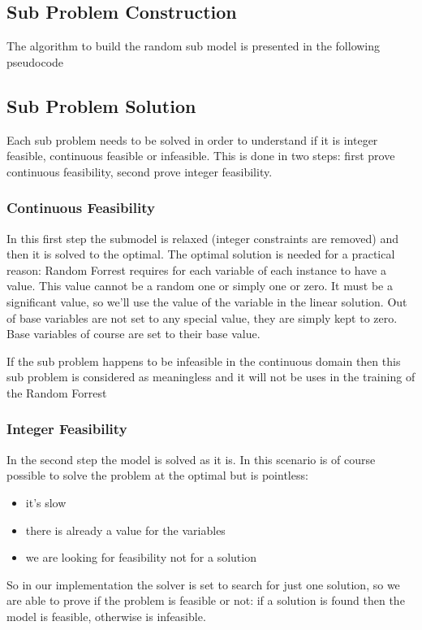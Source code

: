 \subsection{Sub Problem Construction}

The algorithm to build the random sub model is presented in the following pseudocode




\subsection{Sub Problem Solution}
Each sub problem needs to be solved in order to understand if it is integer feasible, continuous feasible or infeasible. 
This is done in two steps: first prove continuous feasibility, second prove integer feasibility. 

\subsubsection{Continuous Feasibility}
In this first step the submodel is relaxed (integer constraints are removed) and then it is solved to the optimal. The optimal solution is needed for a 
practical reason: Random Forrest requires for each variable of each instance to have a value. This value cannot be a random one or simply one or zero. It
must be a significant value, so we'll use the value of the variable in the linear solution. Out of base variables are not set to any special value, they are 
simply kept to zero. Base variables of course are set to their base value. 

If the sub problem happens to be infeasible in the continuous domain then this sub problem is considered as meaningless and it will not be uses in the training of the Random Forrest


\subsubsection{Integer Feasibility}
In the second step the model is solved as it is. In this scenario is of course possible to solve the problem at the optimal but is pointless: 
\begin{itemize}
    \item it's slow
    \item there is already a value for the variables
    \item we are looking for feasibility not for a solution
\end{itemize}
So in our implementation the solver is set to search for just one solution, so we are able to prove if the problem is feasible or not: if a solution is found then the model is feasible, otherwise
is infeasible.


